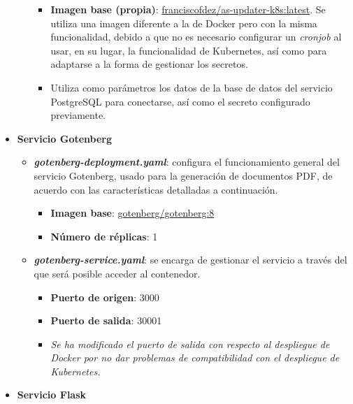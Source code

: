 \documentclass{report}
\begin{document}
\begin{itemize}
\begin{itemize}
                    \begin{itemize}
                        \item \textbf{Imagen base (propia)}: \href{https://hub.docker.com/r/franciscofdez/as-updater-k8s}{franciscofdez/as-updater-k8s:latest}. Se utiliza una imagen diferente a la de Docker pero con la misma funcionalidad, debido a que no es necesario configurar un \textit{cronjob} al usar, en su lugar, la funcionalidad de Kubernetes, así como para adaptarse a la forma de gestionar los secretos.
                        \item Utiliza como parámetros los datos de la base de datos del servicio PostgreSQL para conectarse, así como el secreto configurado previamente.
                    \end{itemize}
                \end{itemize}
                \item \textbf{Servicio Gotenberg}
                \begin{itemize}
                    \item \textit{\textbf{gotenberg-deployment.yaml}}: configura el funcionamiento general del servicio Gotenberg, usado para la generación de documentos PDF, de acuerdo con las características detalladas a continuación.
                    \begin{itemize}
                        \item \textbf{Imagen base}: \href{https://hub.docker.com/r/gotenberg/gotenberg/}{gotenberg/gotenberg:8}
                        \item \textbf{Número de réplicas}: 1
                    \end{itemize}
                    \item \textit{\textbf{gotenberg-service.yaml}}: se encarga de gestionar el servicio a través del que será posible acceder al contenedor.
                    \begin{itemize}
                        \item \textbf{Puerto de origen}: 3000
                        \item \textbf{Puerto de salida}: 30001
                        \item \textit{Se ha modificado el puerto de salida con respecto al despliegue de Docker por no dar problemas de compatibilidad con el despliegue de Kubernetes.}
                    \end{itemize}
                \end{itemize}
                \item \textbf{Servicio Flask}

\end{itemize}
\end{document}
